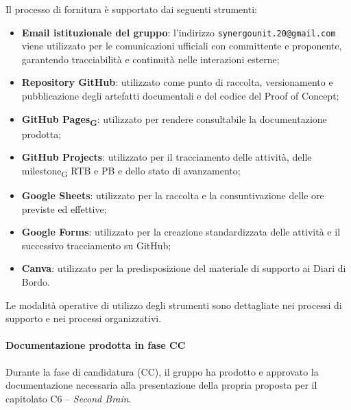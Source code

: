Il processo di fornitura è supportato dai seguenti strumenti:

\begin{itemize}
      \item \textbf{Email istituzionale del gruppo}: l'indirizzo
            \texttt{synergounit.20@gmail.com} viene utilizzato per le comunicazioni ufficiali
            con committente e proponente, garantendo tracciabilità e continuità nelle
            interazioni esterne;

      \item \textbf{Repository GitHub}: utilizzato come punto di raccolta, versionamento
        e pubblicazione degli artefatti documentali e del codice del Proof of Concept;

      \item \textbf{GitHub Pages\textsubscript{G}}: utilizzato per rendere consultabile la documentazione
      prodotta;

      \item \textbf{GitHub Projects}: utilizzato per il tracciamento delle attività,
      delle milestone\textsubscript{G} RTB e PB e dello stato di avanzamento;

      \item \textbf{Google Sheets}: utilizzato per la raccolta e la consuntivazione
      delle ore previste ed effettive;

      \item \textbf{Google Forms}: utilizzato per la creazione standardizzata delle
      attività e il successivo tracciamento su GitHub;

      \item \textbf{Canva}: utilizzato per la predisposizione del materiale di supporto
      ai Diari di Bordo.
\end{itemize}

Le modalità operative di utilizzo degli strumenti sono dettagliate nei processi
di supporto e nei processi organizzativi.


\paragraph{Documentazione prodotta in fase CC}

Durante la fase di candidatura (CC), il gruppo ha prodotto e
approvato la documentazione necessaria alla presentazione della propria proposta
per il capitolato C6 -- \textit{Second Brain}.

